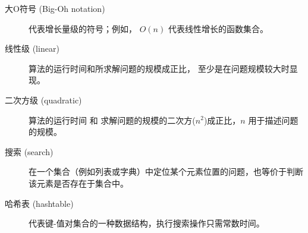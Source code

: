 \begin{description}
\item[大O符号 (Big-Oh notation)] 代表增长量级的符号；例如， $O(n)$ 代表线性增长的函数集合。


\item[线性级 (linear)] 算法的运行时间和所求解问题的规模成正比， 至少是在问题规模较大时显现。


\item[二次方级 (quadratic)] 算法的运行时间 和 求解问题的规模的二次方($n^2$)成正比，$n$ 用于描述问题的规模。


\item[搜索 (search)] 在一个集合（例如列表或字典）中定位某个元素位置的问题，也等价于判断该元素是否存在于集合中。


\item[哈希表 (hashtable)] 代表键-值对集合的一种数据结构，执行搜索操作只需常数时间。

\end{description}
